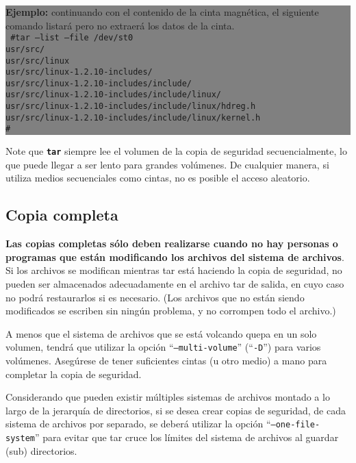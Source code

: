 \documentclass[12pt]{article}
\begin{document}
\colorbox{grey}{\parbox[t]{0.95\linewidth}{ \vspace*{0.5cm} { 
{\bf Ejemplo:} continuando con el contenido de la cinta magnética, el 
siguiente comando listará pero no extraerá los datos de la cinta.\\  
{\tt
\#tar --list --file /dev/st0\\
usr/src/\\
usr/src/linux\\
usr/src/linux-1.2.10-includes/\\
usr/src/linux-1.2.10-includes/include/\\
usr/src/linux-1.2.10-includes/include/linux/\\
usr/src/linux-1.2.10-includes/include/linux/hdreg.h\\
usr/src/linux-1.2.10-includes/include/linux/kernel.h\\
\#\\
}
} \vspace*{0.5cm} } } 

Note que \texttt{\textbf{tar}} siempre lee el volumen de la copia de 
seguridad secuencialmente, lo que puede llegar a ser lento para grandes 
volúmenes.  De cualquier manera, si utiliza medios secuenciales como 
cintas, no es posible el acceso aleatorio.

\subsection*{Copia completa}
{\bf Las copias completas sólo deben realizarse cuando no hay personas o 
programas que están modificando los archivos del sistema de archivos}. Si 
los archivos se modifican mientras tar está haciendo la copia de seguridad,
no pueden ser almacenados adecuadamente en el archivo tar de salida, en 
cuyo caso no podrá restaurarlos si es necesario. (Los archivos que  no 
están siendo modificados se escriben sin ningún problema, y no corrompen 
todo el archivo.)

A menos que el sistema de archivos que se está volcando quepa en un solo 
volumen, tendrá que utilizar la opción ``{\tt --multi-volume}'' 
(``{\tt -D}'') para varios volúmenes.  Asegúrese de tener suficientes 
cintas (u otro medio) a mano para completar la copia de seguridad.

Considerando que pueden existir múltiples sistemas de archivos montado a lo
largo de la jerarquía de directorios, si se desea crear copias de seguridad,
de cada sistema de archivos por separado, se deberá utilizar la opción 
``{\tt --one-file-system}'' para evitar que tar cruce los límites
del sistema de archivos al guardar (sub) directorios.
\end{document}
